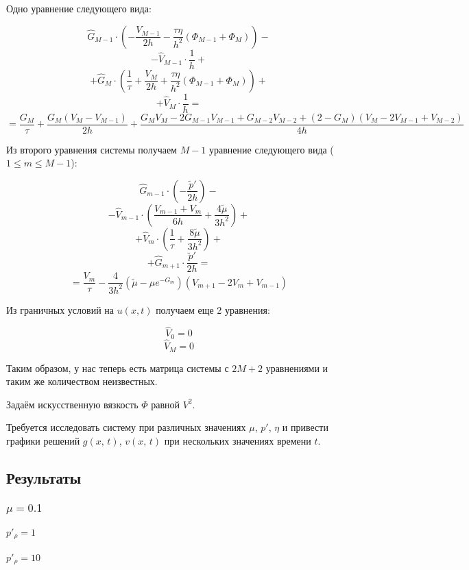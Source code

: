 \documentclass[12pt]{article}
\begin{document}
Одно уравнение следующего вида:

$$
\hat{G}_{M-1} \cdot \left(-\frac{V_{M-1}}{2h} - \frac{\tau\eta}{h^2}\left(\Phi_{M-1} + \Phi_{M}\right)\right)
-
$$
$$
- \hat{V}_{M-1} \cdot \frac{1}{h}
+
$$
$$
+ \hat{G}_{M}   \cdot \left( \frac{1}{\tau} + \frac{V_M}{2h} + \frac{\tau\eta}{h^2}\left(\Phi_{M-1} + \Phi_{M}\right)\right)
+
$$
$$
+ \hat{V}_{M}   \cdot \frac{1}{h} 
= 
$$
$$
= \frac{G_M}{\tau} +
  \frac{G_M \left( V_M - V_{M-1} \right) }{2h} +
  \frac{G_M V_M - 2 G_{M-1} V_{M-1} + G_{M-2} V_{M-2} +
      \left( 2 - G_M \right) \left( V_M - 2 V_{M-1} + V_{M-2} \right) }{4h}
$$

Из второго уравнения системы получаем $M - 1$ уравнение следующего вида ($1 \leq m \leq M - 1$):

$$
\hat{G}_{m-1} \cdot \left (-\frac{\tilde{p}'}{2h}\right)
-
$$
$$
- \hat{V}_{m-1} \cdot \left( \frac{V_{m-1} + V_m}{6h} + \frac{4\tilde\mu}{3h^2} \right)
+
$$
$$
+ \hat{V}_{m}   \cdot \left( \frac{1}{\tau} + \frac{8\tilde\mu}{3h^2}  \right)
+
$$
$$
+ \hat{G}_{m+1} \cdot \frac{\tilde{p}'}{2h} =
$$
$$
= \frac{V_m}{\tau} 
- \frac{4}{3h^2}\left(\tilde\mu - \mu e^{-G_m}\right)\left(V_{m+1} - 2V_{m} + V_{m-1}\right)
$$

Из граничных условий на $u(x, t)$ получаем еще 2 уравнения:

$$
\hat{V}_{0} = 0
$$
$$
\hat{V}_{M} = 0
$$

Таким образом, у нас теперь есть матрица системы с $2M + 2$ уравнениями и таким же количеством неизвестных.

Задаём искусственную вязкость $\Phi$ равной $V^2$.

Требуется исследовать систему при различных значениях $\mu$, $p'$, $\eta$ и привести графики решений $g(x{,}\, t)$, $v(x{,}\, t)$ при нескольких значениях времени $t$.

\subsection{Результаты}

\subsubsection{$\mu = 0.1$}
\paragraph{$p'_{\rho} = 1$}
\paragraph{$p'_{\rho} = 10$}
\end{document}
